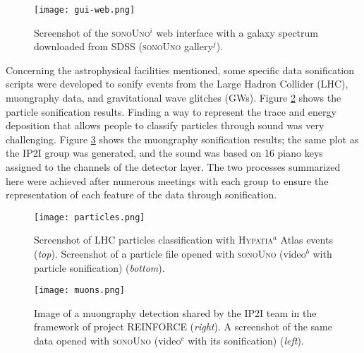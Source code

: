 \documentclass[baaa]{baaa}
\begin{document}
\begin{figure}[!t]
\centering
    \texttt{[image: gui-web.png]}
    \caption{Screenshot of the \textsc{sonoUno}$^{i}$ web interface with a galaxy spectrum downloaded from {SDSS} ({\textsc{sonoUno} gallery}$^{j}$).}
    \label{fig:guiweb}
\end{figure}




Concerning the astrophysical facilities mentioned, some specific data sonification scripts were developed to sonify events from the Large Hadron Collider (LHC), muongraphy data, and gravitational wave glitches (GWs). Figure \ref{fig:particle} shows the particle sonification results. Finding a way to represent the trace and energy deposition that allows people to classify particles through sound was very challenging. Figure \ref{fig:muons} shows the muongraphy sonification results; the same plot as the IP2I group was generated, and the sound was based on 16 piano keys assigned to the channels of the detector layer. The two processes summarized here were achieved after numerous meetings with each group to ensure the representation of each feature of the data through sonification.

\begin{figure}[!t]
\centering
    \texttt{[image: particles.png]}
    \caption{Screenshot of LHC particles classification with {\textsc{Hypatia}}$^{a}$ Atlas events (\emph{top}). Screenshot of a particle file opened with \textsc{sonoUno} ({video}$^{b}$ with particle sonification) (\emph{bottom}).}
    \label{fig:particle}
\end{figure}


\begin{figure}[!t]
\centering
    \texttt{[image: muons.png]}
    \caption{Image of a muongraphy detection shared by the IP2I team in the framework of project REINFORCE (\emph{right}). A screenshot of the same data opened with \textsc{sonoUno} ({video}$^{c}$ with its sonification) (\emph{left}).}
    \label{fig:muons}
\end{figure}
\end{document}
